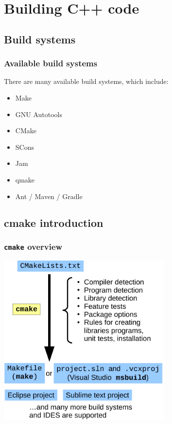 \documentclass{beamer}
\newcommand{\cmd}[1]{\textbf{\texttt{#1}}}
\begin{document}
\section{Building C++ code}

\subsection{Build systems}

\begin{frame}
  \frametitle{Available build systems}
  There are many available build systems, which include:

  \begin{itemize}
  \item Make
  \item GNU Autotools
  \item CMake
  \item SCons
  \item Jam
  \item qmake
  \item Ant / Maven / Gradle
  \end{itemize}
\end{frame}

\subsection{cmake introduction}

\begin{frame}
  \frametitle{\cmd{cmake} overview}
  \medskip
  \centering
  \includegraphics[width=0.65\textwidth]{cmake-flow}
\end{frame}
\end{document}
